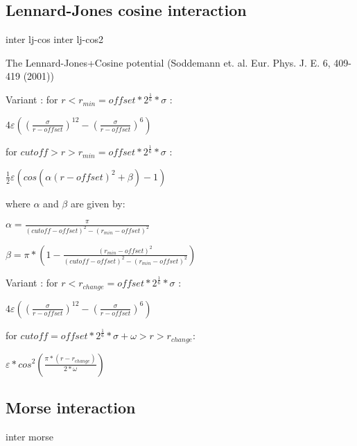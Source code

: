 \subsection{Lennard-Jones cosine interaction}
\begin{essyntax}
  inter   lj-cos
     
  inter   lj-cos2
     \var{$\omega$}
\end{essyntax}
The Lennard-Jones+Cosine potential 
(Soddemann et. al. Eur. Phys. J. E. 6, 409-419 (2001))


Variant : for $r < r_{min} = offset * 2^{\frac{1}{6}} *
\sigma$ :
\begin{center}
$4\varepsilon((\frac{\sigma}{r-offset})^{12}-(\frac{\sigma}{r-offset})^6)$
\end{center}
for $cutoff > r > r_{min} = offset * 2^{\frac{1}{6}} * \sigma$ :
\begin{center}
$\frac{1}{2}\varepsilon(cos(\alpha(r-offset)^2 + \beta)-1)$
\end{center}
where $\alpha$ and $\beta$ are given by:

$\alpha = \frac{\pi}{(cutoff-offset)^2-(r_{min}-offset)^2}$

$\beta = \pi * (1 -
\frac{(r_{min}-offset)^2}{(cutoff-offset)^2-(r_{min}-offset)^2})$

Variant :
for $r < r_{change} = offset * 2^{\frac{1}{6}} * \sigma$ :
\begin{center}
$4 \varepsilon((\frac{\sigma}{r-offset})^{12}-(\frac{\sigma}{r-offset})^6)$
\end{center}
for $cutoff = offset * 2^{\frac{1}{6}} * \sigma + \omega > r > r_{change}$:
\begin{center}
$\varepsilon * cos^2(\frac{\pi * (r - r_{change})}{2 * \omega})$
\end{center}

\subsection{Morse interaction}

\begin{essyntax}
  inter   morse
     
\end{essyntax}


